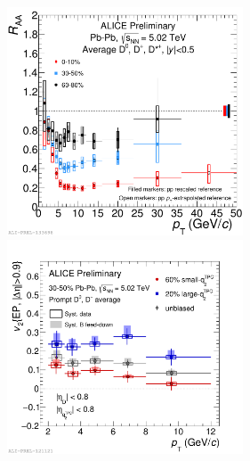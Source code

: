 \begin{figure}[!ht]
  \centering
    \includegraphics[width=7cm]{FigCap2/2017-Jul-05-DmesonAverage_010_3050_6080_comparison_04July2017.pdf}
    \includegraphics[width=7cm]{FigCap2/2017-Sep-13-v2ESE_Daverage_PbPb3050_VZERO_q2TPCFullSmall60Perc_q2TPCFullLarge20perc.pdf}
  \caption{}
  \label{fig:}
\end{figure}

